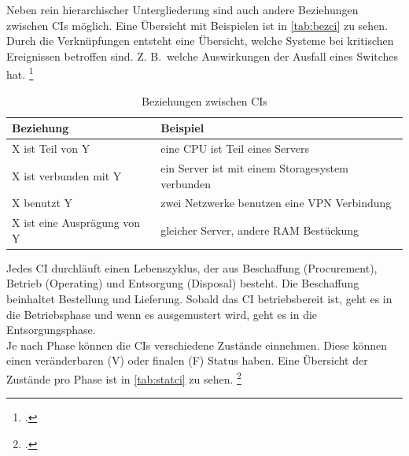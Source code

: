 Neben rein hierarchischer Untergliederung sind auch andere Beziehungen zwischen \acsp{CI} möglich. Eine Übersicht mit Beispielen ist in \autoref{tab:bezci} zu sehen.\\
Durch die Verknüpfungen entsteht eine Übersicht, welche Systeme bei kritischen Ereignissen betroffen sind. Z. B.~welche Auswirkungen der Ausfall eines Switches hat.
\footcite[Vgl.][74\psq]{Olbrich_2008_ITIL}

\begin{table}[H]
\centering
\begin{tabularx}{0.8\textwidth}{l|X}
                            Beziehung & Beispiel \\\hline
                            X ist Teil von Y & eine CPU ist Teil eines Servers\\
                            X ist verbunden mit Y & ein Server ist mit einem Storagesystem verbunden \\
                            X benutzt Y & zwei Netzwerke benutzen eine VPN Verbindung \\
                            X ist eine Ausprägung von Y & gleicher Server, andere RAM Bestückung \\
\end{tabularx}
\caption{Beziehungen zwischen \aclp{CI}}
\label{tab:bezci}
\end{table}



Jedes \acs{CI} durchläuft einen Lebenszyklus, der aus Beschaffung (Procurement), Betrieb (Operating) und Entsorgung (Disposal) besteht.
Die Beschaffung beinhaltet Bestellung und Lieferung. Sobald das \acs{CI} betriebsbereit ist, geht es in die Betriebsphase und wenn es ausgemustert wird, geht es in die Entsorgungsphase.\\
Je nach Phase können die \acsp{CI} verschiedene Zustände einnehmen. Diese können einen veränderbaren (V) oder finalen (F) Status haben. Eine Übersicht der Zustände pro Phase ist in \autoref{tab:statci} zu sehen.
\footcite[Vgl.][76\psq]{Olbrich_2008_ITIL}

